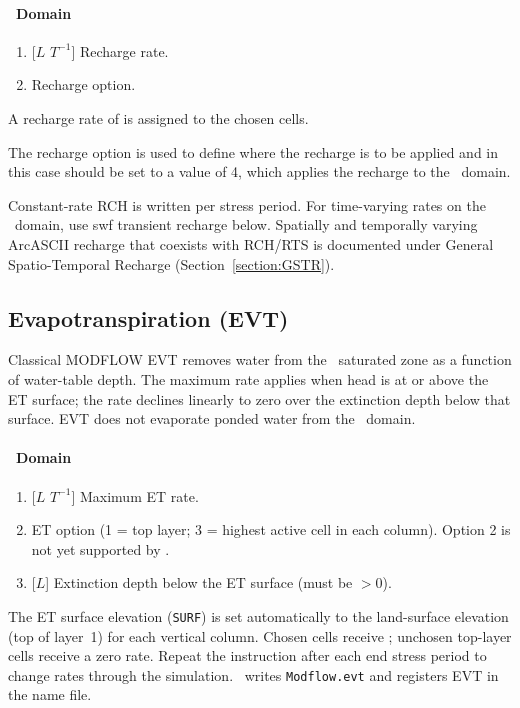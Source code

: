 \paragraph*{\swf\ Domain}
    {
        \squish
        \begin{enumerate}
            \item {} [$L$ $T^{-1}$] Recharge rate.
            \item {}  Recharge option.
        \end{enumerate}
        A recharge rate of  is assigned to the chosen cells.

        The recharge option  is used to define where the recharge is to be applied and in this case should be set to a value of 4, which applies the recharge to the \swf\ domain.
    }

Constant-rate \textsf{RCH} is written per stress period.
For time-varying rates on the \swf\ domain, use {\sf swf transient recharge} below.
Spatially and temporally varying ArcASCII recharge that coexists with \textsf{RCH}/\textsf{RTS} is documented under General Spatio-Temporal Recharge (Section~\ref{section:GSTR}).

\subsection{Evapotranspiration (\textsf{EVT})}
Classical MODFLOW \textsf{EVT} removes water from the \gwf\ saturated zone as a function of water-table depth. The maximum rate applies when head is at or above the ET surface; the rate declines linearly to zero over the extinction depth below that surface. \textsf{EVT} does not evaporate ponded water from the \swf\ domain.

\paragraph*{\gwf\ Domain}
    {
        \squish
        \begin{enumerate}
            \item {} [$L$ $T^{-1}$]  Maximum ET rate.
            \item {}  ET option (1 = top layer; 3 = highest active cell in each column). Option 2 is not yet supported by \mut.
            \item {} [$L$]  Extinction depth below the ET surface (must be $> 0$).
        \end{enumerate}
        The ET surface elevation (\texttt{SURF}) is set automatically to the land-surface elevation (top of layer~1) for each vertical column.
        Chosen cells receive ; unchosen top-layer cells receive a zero rate.
        Repeat the instruction after each \textsf{end stress period} to change rates through the simulation.
        \mut\ writes \texttt{Modflow.evt} and registers \textsf{EVT} in the name file.
    }

